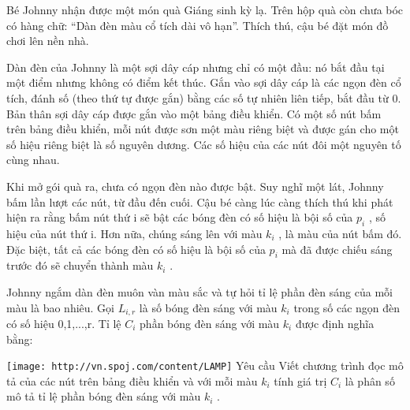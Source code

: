 Bé Johnny nhận được một món quà Giáng sinh kỳ lạ. Trên hộp quà còn chưa bóc có hàng chữ: “Dàn đèn màu cổ tích dài vô hạn”. Thích thú, cậu bé đặt món đồ chơi lên nền nhà.  

   Dàn đèn của Johnny là một sợi dây cáp nhưng chỉ có một đầu: nó bắt đầu tại một điểm nhưng không có điểm kết thúc. Gắn vào sợi dây cáp là các ngọn đèn cổ tích, đánh số (theo thứ tự được gắn) bằng các số tự nhiên liên tiếp, bắt đầu từ 0. Bản thân sợi dây cáp được gắn vào một bảng điều khiển. Có một số nút bấm trên bảng điều khiển, mỗi nút được sơn một màu riêng biệt và được gán cho một số hiệu  riêng biệt là số nguyên dương. Các số hiệu của các nút đôi một nguyên tố cùng nhau.  

   Khi mở gói quà ra, chưa có ngọn đèn nào được bật. Suy nghĩ một lát, Johnny bấm lần lượt các nút, từ đầu đến cuối. Cậu bé càng lúc càng thích thú khi phát hiện ra rằng bấm nút thứ i sẽ bật các bóng đèn có số hiệu là bội số của $p_{i}$   , số hiệu của nút thứ i. Hơn nữa, chúng sáng lên với màu $k_{i}$   , là màu của nút bấm đó. Đặc biệt, tất cả các bóng đèn có số hiệu là bội số của $p_{i}$   mà đã được chiếu sáng trước đó sẽ chuyển thành màu $k_{i}$   .  

   Johnny ngắm dàn đèn muôn vàn màu sắc và tự hỏi tỉ lệ phần đèn sáng của mỗi màu là bao nhiêu. Gọi $L_{i,r}$   là số bóng đèn sáng với màu $k_{i}$   trong số các ngọn đèn có số hiệu 0,1,...,r. Tỉ lệ $C_{i}$   phần bóng đèn sáng với màu $k_{i}$   được định nghĩa bằng:  


\texttt{[image: http://vn.spoj.com/content/LAMP]}
   Yêu cầu  
Viết chương trình đọc mô tả của các nút trên bảng điều khiển và với mỗi màu $k_{i}$   tính giá trị $C_{i}$   là phân số mô tả tỉ lệ phần bóng đèn sáng với màu $k_{i}$   .
